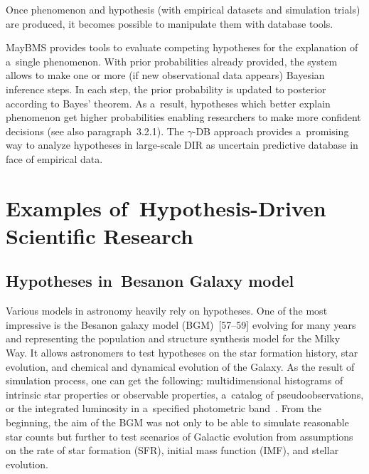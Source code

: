 \begin{multicols}{2}
   Once phenomenon and hypothesis (with
empirical datasets and simulation trials) are produced, it becomes possible to
manipulate them with database tools.

  MayBMS provides tools to evaluate competing hypotheses for the explanation of a~single phenomenon. With prior probabilities already provided,
  the system allows to
make one or more (if new observational data appears) Bayesian inference steps. In
each step, the prior probability is updated to posterior according to Bayes' theorem.
As a~result, hypotheses which better explain phenomenon get higher probabilities
enabling researchers to make more confident decisions (see also
paragraph~3.2.1). The
  $\gamma$-DB approach provides a~promising way to analyze hypotheses in
  large-scale DIR as uncertain predictive database in face of empirical data.

  \vspace*{-6pt}

\section{Examples of~Hypothesis-Driven Scientific Research}

\vspace*{-3pt}

\subsection{Hypotheses in~Besan{\!\!\fontsize{14pt}{10pt}\selectfont{}}on Galaxy model}

\vspace*{-1pt}

  \noindent
  Various models in astronomy heavily rely on hypotheses. One of the most
impressive is the Besan{\!\fontsize{12pt}{10pt}\selectfont{}}on galaxy model (BGM)~[57--59]
evolving for many years and representing the population and structure synthesis
model for the Milky Way. It allows astronomers to test hypotheses on the star
formation history, star evolution, and chemical and dynamical evolution of the
Galaxy.  As the result of simulation process, one can get the following:
multidimensional histograms of intrinsic star properties or observable properties, a~catalog
of pseudoobservations, or the integrated luminosity in a~specified photometric
band~\cite{60-kl}. From the beginning, the aim of the BGM was not only to be able to
simulate reasonable star counts but further to test scenarios of Galactic evolution
from assumptions on the rate of star formation (SFR), initial mass function (IMF),
and stellar evolution.


\end{multicols}
